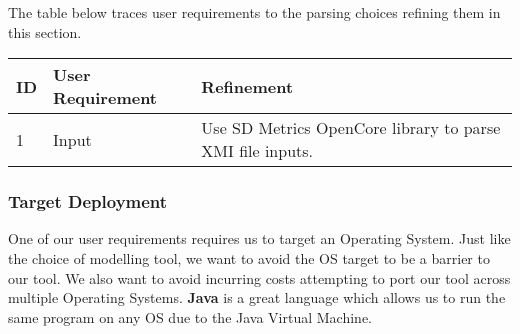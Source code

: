 \documentclass[11pt]{article}
\begin{document}
    The table below traces user requirements to the parsing choices refining them in this section.
    \begin{table}[htbp]
        \centering
        \begin{tabularx}{\textwidth}{| l | l | X |}
            \hline
            \textbf{ID} & \textbf{User Requirement} & \textbf{Refinement} \\
            \hline
            1 & Input & Use SD Metrics OpenCore library to parse XMI file inputs. \\ \hline
        \end{tabularx}\label{tab:parse-choice-table}
    \end{table}

    \newpage
    \subsubsection{Target Deployment}
    One of our user requirements requires us to target an Operating System.
    Just like the choice of modelling tool, we want to avoid the OS target to be a barrier to our tool.
    We also want to avoid incurring costs attempting to port our tool across multiple Operating Systems.
    \textbf{Java} is a great language which allows us to run the same program on any OS due to the Java Virtual Machine.
\end{document}
